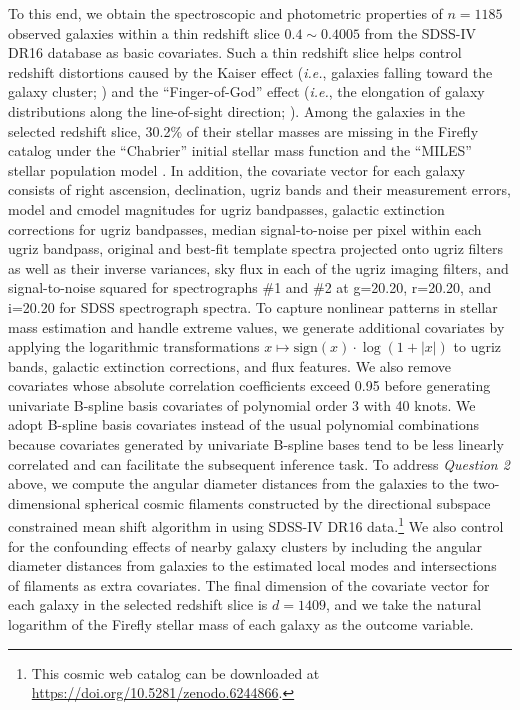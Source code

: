 \documentclass[ejsv2,noshowframe]{imsart}
\theoremstyle{plain}
\theoremstyle{definition}
\theoremstyle{remark}
\begin{document}
To this end, we obtain the spectroscopic and photometric properties of $n=1185$ observed galaxies within a thin redshift slice $0.4\sim 0.4005$ from the SDSS-IV DR16 database as basic covariates. Such a thin redshift slice helps control redshift distortions caused by the Kaiser effect (\emph{i.e.}, galaxies falling toward the galaxy cluster; \citealt{kaiser1987clustering}) and the ``Finger-of-God'' effect (\emph{i.e.}, the elongation of galaxy distributions along the line-of-sight direction; \citealt{jackson1972critique}). Among the galaxies in the selected redshift slice, 30.2\% of their stellar masses are missing in the Firefly catalog under the ``Chabrier'' initial stellar mass function \citep{chabrier2003galactic} and the ``MILES'' stellar population model \citep{maraston2011stellar}. In addition, the covariate vector for each galaxy consists of right ascension, declination, ugriz bands and their measurement errors, model and cmodel magnitudes for ugriz bandpasses, galactic extinction corrections for ugriz bandpasses, median signal-to-noise per pixel within each ugriz bandpass, original and best-fit template spectra projected onto ugriz filters as well as their inverse variances, sky flux in each of the ugriz imaging filters, and signal-to-noise squared for spectrographs \#1 and \#2 at g=20.20, r=20.20, and i=20.20 for SDSS spectrograph spectra. To capture nonlinear patterns in stellar mass estimation and handle extreme values, we generate additional covariates by applying the logarithmic transformations $x\mapsto \text{sign}(x)\cdot \log(1+|x|)$ to ugriz bands, galactic extinction corrections, and flux features. We also remove covariates whose absolute correlation coefficients exceed 0.95 before generating univariate B-spline basis covariates of polynomial order 3 with 40 knots. We adopt B-spline basis covariates instead of the usual polynomial combinations because covariates generated by univariate B-spline bases tend to be less linearly correlated and can facilitate the subsequent inference task. To address \emph{Question 2} above, we compute the angular diameter distances from the galaxies to the two-dimensional spherical cosmic filaments constructed by the directional subspace constrained mean shift algorithm in \cite{zhang2023linear,zhang2022sconce} using SDSS-IV DR16 data.\footnote{This cosmic web catalog can be downloaded at \url{https://doi.org/10.5281/zenodo.6244866}.} We also control for the confounding effects of nearby galaxy clusters by including the angular diameter distances from galaxies to the estimated local modes and intersections of filaments as extra covariates. The final dimension of the covariate vector for each galaxy in the selected redshift slice is $d=1409$, and we take the natural logarithm of the Firefly stellar mass of each galaxy as the outcome variable.
\end{document}
